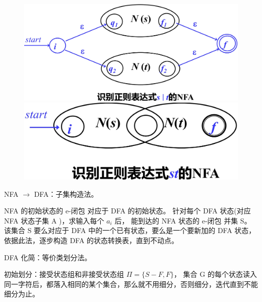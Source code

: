 \begin{figure}[H]
    \centering
    \includegraphics[width=0.4\linewidth]{figures/lex4.png}
    \includegraphics[width=0.4\linewidth]{figures/lex5.png}
\end{figure}
\par \noindent NFA $\rightarrow$ DFA：子集构造法。
\par \noindent NFA 的初始状态的 e-闭包 对应于 DFA 的初始状态。
针对每个 DFA 状态(对应 NFA 状态子集 A )，求输入每个 $a_i$ 后，
能到达的 NFA 状态的 e-闭包 并集 S。
该集合 S 要么对应于 DFA 中的一个已有状态，要么是一个要新加的 DFA 状态，
依据此法，逐步构造 DFA 的状态转换表，直到不动点。
\par \noindent DFA 化简：等价类划分法。
\par \noindent 初始划分：接受状态组和非接受状态组 $\Pi = \{S−F, F\}$，
集合 G 的每个状态读入同一字符后，都落入相同的某个集合，那么就不用细分，否则细分，迭代直到不能细分为止。
